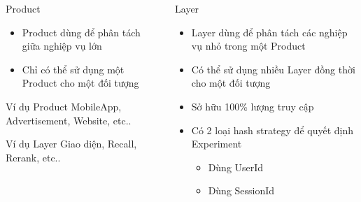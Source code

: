 \begin{frame}
	\begin{columns}
		\begin{column}{0.5\textwidth}
			\begin{block}{Product}
				\begin{itemize}
					\item Product dùng để phân tách giữa nghiệp vụ lớn
					\item Chỉ có thể sử dụng một Product cho một đối tượng
				\end{itemize}
			\end{block}
			\begin{block}{Ví dụ Product}
				MobileApp, Advertisement, Website, etc..
			\end{block}
			\begin{block}{Ví dụ Layer}
				Giao diện, Recall, Rerank, etc..
			\end{block}
		\end{column}
		\begin{column}{0.5\textwidth}
			\begin{block}{Layer}
				\begin{itemize}
					\item Layer dùng để phân tách các nghiệp vụ nhỏ trong một Product
					\item Có thể sử dụng nhiều Layer đồng thời cho một đối tượng
					\item Sở hữu 100\% lượng truy cập
					\item Có 2 loại hash strategy để quyết định Experiment
					      \begin{itemize}
						      \item Dùng UserId
						      \item Dùng SessionId
					      \end{itemize}
				\end{itemize}
			\end{block}
		\end{column}
	\end{columns}
\end{frame}


